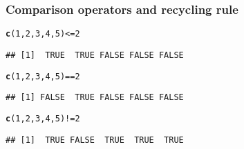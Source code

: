 \documentclass[12pt]{beamer}\usepackage[]{graphicx}\usepackage[]{color}
\makeatletter
\newcommand{\hlnum}[1]{\textcolor[rgb]{0.686,0.059,0.569}{#1}}%
\newcommand{\hlopt}[1]{\textcolor[rgb]{0,0,0}{#1}}%
\newcommand{\hlstd}[1]{\textcolor[rgb]{0.345,0.345,0.345}{#1}}%
\newcommand{\hlkwd}[1]{\textcolor[rgb]{0.737,0.353,0.396}{\textbf{#1}}}%
\newenvironment{kframe}{%
 \def\at@end@of@kframe{}%
 \ifinner\ifhmode%
  \def\at@end@of@kframe{\end{minipage}}%
  \begin{minipage}{\columnwidth}%
 \fi\fi%
 \def\FrameCommand##1{\hskip\@totalleftmargin \hskip-\fboxsep
 \colorbox{shadecolor}{##1}\hskip-\fboxsep
     \hskip-\linewidth \hskip-\@totalleftmargin \hskip\columnwidth}%
 \MakeFramed {\advance\hsize-\width
   \@totalleftmargin\z@ \linewidth\hsize
   \@setminipage}}%
 {\par\unskip\endMakeFramed%
 \at@end@of@kframe}
\newenvironment{knitrout}{}{} %
\makeatother
\begin{document}
\begin{frame}[fragile]
\frametitle{Comparison operators and recycling rule}

\begin{knitrout}\footnotesize
{}\color{fgcolor}\begin{kframe}
\begin{alltt}
\hlkwd{c}\hlstd{(}\hlnum{1}\hlstd{,} \hlnum{2}\hlstd{,} \hlnum{3}\hlstd{,} \hlnum{4}\hlstd{,} \hlnum{5}\hlstd{)} \hlopt{<=} \hlnum{2}
\end{alltt}
\begin{verbatim}
## [1]  TRUE  TRUE FALSE FALSE FALSE
\end{verbatim}
\begin{alltt}
\hlkwd{c}\hlstd{(}\hlnum{1}\hlstd{,} \hlnum{2}\hlstd{,} \hlnum{3}\hlstd{,} \hlnum{4}\hlstd{,} \hlnum{5}\hlstd{)} \hlopt{==} \hlnum{2}
\end{alltt}
\begin{verbatim}
## [1] FALSE  TRUE FALSE FALSE FALSE
\end{verbatim}
\begin{alltt}
\hlkwd{c}\hlstd{(}\hlnum{1}\hlstd{,} \hlnum{2}\hlstd{,} \hlnum{3}\hlstd{,} \hlnum{4}\hlstd{,} \hlnum{5}\hlstd{)} \hlopt{!=} \hlnum{2}
\end{alltt}
\begin{verbatim}
## [1]  TRUE FALSE  TRUE  TRUE  TRUE
\end{verbatim}
\end{kframe}
\end{knitrout}

\end{frame}

\end{document}
